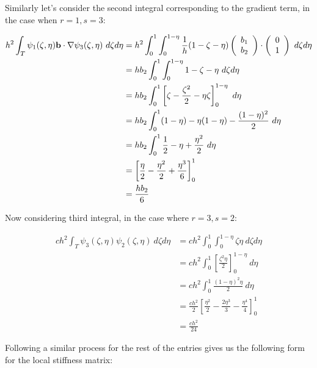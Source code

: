Similarly let's consider the second integral corresponding to the gradient term,
in the case when $r = 1, s = 3$:

\begin{align*}
    h^2\int_T\psi_1(\zeta,\eta)\v{b} \cdot \nabla\psi_3(\zeta,\eta)\ d\zeta d\eta
     &= h^2\int_0^1\int_0^{1-\eta}\frac{1}{h}(1 - \zeta - \eta)
           \left(\begin{array}{c} b_1 \\b_2 \end{array}\right) \cdot
           \left(\begin{array}{c} 0 \\ 1 \end{array}\right)\ d\zeta d\eta \\
     &= hb_2\int_0^1\int_0^{1-\eta} 1 - \zeta - \eta \ d\zeta d\eta \\
     &= hb_2\int_0^1\left[\zeta - \frac{\zeta^2}{2} - \eta\zeta \right]_0^{1-\eta}\ d\eta \\
     &= hb_2\int_0^1(1 -\eta) - \eta(1-\eta) - \frac{(1 - \eta)^2}{2}\ d\eta \\
     &= hb_2\int_0^1\frac{1}{2} -\eta +\frac{\eta^2}{2}\ d\eta \\
     &= \left[\frac{\eta}{2} - \frac{\eta^2}{2} + \frac{\eta^3}{6}\right]_0^1 \\
     &= \frac{hb_2}{6}
\end{align*}

Now considering third integral, in the case where $r = 3, s = 2$:

\begin{align*}
    ch^2\int_T\psi_3(\zeta,\eta)\psi_2(\zeta,\eta)\ d\zeta d\eta
    &= ch^2\int_0^1\int_0^{1-\eta}\zeta\eta\ d\zeta d\eta \\
    &= ch^2\int_0^1\left[\frac{\zeta^2\eta}{2}\right]_0^{1-\eta}\ d\eta \\
    &= ch^2\int_0^1\frac{(1-\eta)^2\eta}{2}\ d\eta \\
    &= \frac{ch^2}{2}\left[\frac{\eta^2}{2} - \frac{2\eta^3}{3} - \frac{\eta^4}{4}\right]_0^1 \\
    &= \frac{ch^2}{24}
\end{align*}

Following a similar process for the rest of the entries gives us the following
form for the local stiffness matrix:

